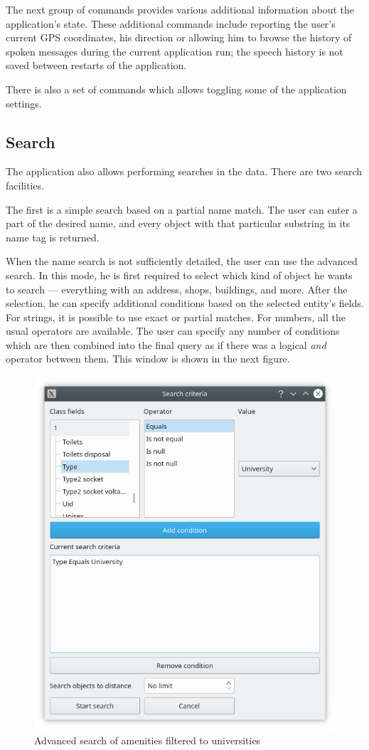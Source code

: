\documentclass[nolof,digital]{fithesis3}
\begin{document}
The next group of commands provides various additional information about the application's state. These additional commands include reporting the user's current GPS coordinates, his direction or allowing him to browse the history of spoken messages during the current application run; the speech history is not saved between restarts of the application.

There is also a set of commands which allows toggling some of the application settings.
\subsection{Search}
The application also allows performing searches in the data. There are two search facilities.

The first is a simple search based on a partial name match. The user can enter a part of the desired name, and every object with that particular substring in its name tag is returned.

When the name search is not sufficiently detailed, the user can use the advanced search. In this mode, he is first required to select which kind of object he wants to search --- everything with an address, shops, buildings, and more. After the selection, he can specify additional conditions based on the selected entity's fields. For strings, it is possible to use exact or partial matches. For numbers, all the usual operators are available. The user can specify any number of conditions which are then combined into the final query as if there was a logical \emph{and} operator between them. This window is shown in the next figure.
\begin{figure}
\caption{Advanced search of amenities filtered to universities}
\includegraphics[width=\textwidth]{fts-amenity-university}
\end{figure}
\end{document}
